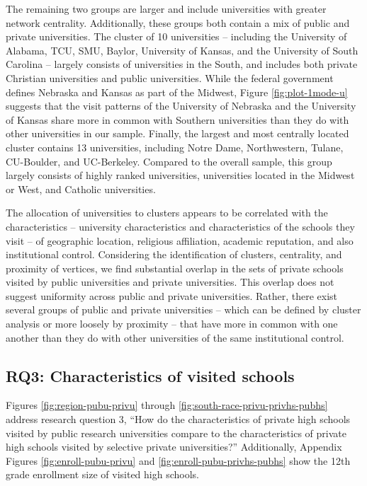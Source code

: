 \documentclass[
  12pt,
]{article}
\begin{document}
The remaining two groups are larger and include universities with greater network centrality. Additionally, these groups both contain a mix of public and private universities. The cluster of 10 universities -- including the University of Alabama, TCU, SMU, Baylor, University of Kansas, and the University of South Carolina -- largely consists of universities in the South, and includes both private Christian universities and public universities. While the federal government defines Nebraska and Kansas as part of the Midwest, Figure \ref{fig:plot-1mode-u} suggests that the visit patterns of the University of Nebraska and the University of Kansas share more in common with Southern universities than they do with other universities in our sample. Finally, the largest and most centrally located cluster contains 13 universities, including Notre Dame, Northwestern, Tulane, CU-Boulder, and UC-Berkeley. Compared to the overall sample, this group largely consists of highly ranked universities, universities located in the Midwest or West, and Catholic universities.

The allocation of universities to clusters appears to be correlated with the characteristics -- university characteristics and characteristics of the schools they visit -- of geographic location, religious affiliation, academic reputation, and also institutional control. Considering the identification of clusters, centrality, and proximity of vertices, we find substantial overlap in the sets of private schools visited by public universities and private universities. This overlap does not suggest uniformity across public and private universities. Rather, there exist several groups of public and private universities -- which can be defined by cluster analysis or more loosely by proximity -- that have more in common with one another than they do with other universities of the same institutional control.

\hypertarget{rq3-characteristics-of-visited-schools}{%
\subsection{RQ3: Characteristics of visited schools}\label{rq3-characteristics-of-visited-schools}}

Figures \ref{fig:region-pubu-privu} through \ref{fig:south-race-privu-privhs-pubhs} address research question 3, ``How do the characteristics of private high schools visited by public research universities compare to the characteristics of private high schools visited by selective private universities?'' Additionally, Appendix Figures \ref{fig:enroll-pubu-privu} and \ref{fig:enroll-pubu-privhs-pubhs} show the 12th grade enrollment size of visited high schools.
\end{document}
